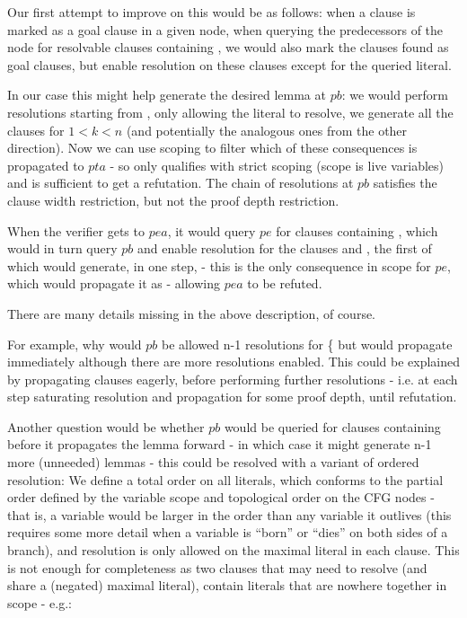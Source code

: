 Our first attempt to improve on this would be as follows: when a clause  is marked as a goal clause in a given node, when querying the predecessors of the node for resolvable clauses containing , we would also mark the clauses found as goal clauses, but enable resolution on these clauses except for the queried literal.

In our case this might help generate the desired lemma at $pb$: we would perform resolutions starting from , only allowing the literal  to resolve, we generate all the clauses  for $1<k<n$ (and potentially the analogous ones from the other direction). Now we can use scoping to filter which of these consequences is propagated to $pta$ - so only  qualifies with strict scoping (scope is live variables) and is sufficient to get a refutation. The chain of resolutions at $pb$ satisfies the clause width restriction, but not the proof depth restriction.

When the verifier gets to $pea$, it would query $pe$ for clauses containing , which would in turn query $pb$ and enable resolution for the clauses  and , the first of which would generate, in one step,  - this is the only consequence in scope for $pe$, which would propagate it as  - allowing $pea$ to be refuted.

There are many details missing in the above description, of course. 

For example, why would $pb$ be allowed n-1 resolutions for \{  but would propagate  immediately although there are more resolutions enabled. This could be explained by propagating clauses eagerly, before performing further resolutions - i.e. at each step saturating resolution and propagation for some proof depth, until refutation.

Another question would be whether $pb$ would be queried for clauses containing  before it propagates the lemma forward - in which case it might generate n-1 more (unneeded) lemmas - this could be resolved with a variant of ordered resolution:
We define a total order on all literals, which conforms to the partial order defined by the variable scope and topological order on the CFG nodes - that is, a variable would be larger in the order than any variable it outlives (this requires some more detail when a variable is ``born'' or ``dies'' on both sides of a branch), and resolution is only allowed on the maximal literal in each clause.
This is not enough for completeness as two clauses that may need to resolve (and share a (negated) maximal literal), contain literals that are nowhere together in scope - e.g.:

